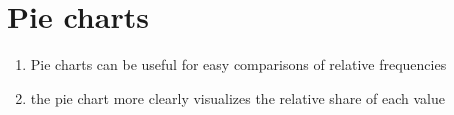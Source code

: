 \section{Pie charts \cite{ism-1}}

\begin{enumerate}
    \item Pie charts can be useful for easy comparisons of relative frequencies

    \item the pie chart more clearly visualizes the relative share of each value

    
\end{enumerate}
